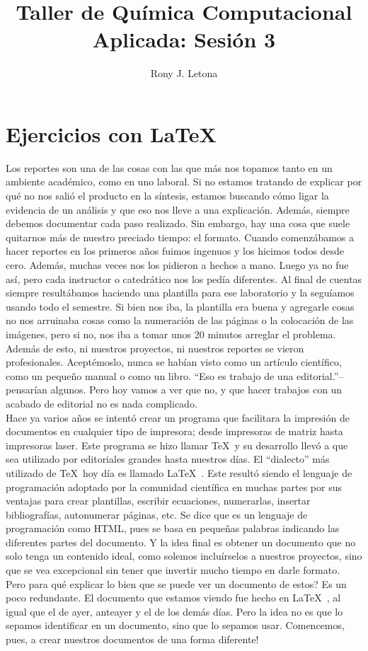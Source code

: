 \documentclass[10pt,letterpaper]{article}
\author{Rony J. Letona}
\title{Taller de Qu\'imica Computacional Aplicada: Sesi\'on 3}
\begin{document}
\maketitle

\section{Ejercicios con \LaTeX\ }
Los reportes son una de las cosas con las que m\'as nos topamos tanto en un ambiente acad\'emico, como en uno laboral. Si no estamos tratando de explicar por qu\'e no nos sali\'o el producto en la s\'intesis, estamos buscando c\'omo ligar la evidencia de un an\'alisis y que eso nos lleve a una explicaci\'on. Adem\'as, siempre debemos documentar cada paso realizado. Sin embargo, hay una cosa que suele quitarnos m\'as de nuestro preciado tiempo: el formato. Cuando comenz\'abamos a hacer reportes en los primeros a\~nos fuimos ingenuos y los hicimos todos desde cero. Adem\'as, muchas veces nos los pidieron a hechos a mano. Luego ya no fue as\'i, pero cada instructor o catedr\'atico nos los ped\'ia diferentes. Al final de cuentas siempre result\'abamos haciendo una plantilla para ese laboratorio y la segu\'iamos usando todo el semestre. Si bien nos iba, la plantilla era buena y agregarle cosas no nos arruinaba cosas como la numeraci\'on de las p\'aginas o la colocaci\'on de las im\'agenes, pero si no, nos iba a tomar unos 20 minutos arreglar el problema. Adem\'as de esto, ni nuestros proyectos, ni nuestros reportes se vieron profesionales. Acept\'emoslo, nunca se hab\'ian visto como un art\'iculo cient\'ifico, como un peque\~no manual o como un libro. ``Eso es trabajo de una editorial.''--pensar\'ian algunos. Pero hoy vamos a ver que no, y que hacer trabajos con un acabado de editorial no es nada complicado.\\

Hace ya varios a\~nos se intent\'o crear un programa que facilitara la impresi\'on de documentos en cualquier tipo de impresora; desde impresoras de matriz hasta impresoras laser. Este programa se hizo llamar \TeX\ y su desarrollo llev\'o a que sea utilizado por editoriales grandes hasta nuestros d\'ias. El ``dialecto'' m\'as utilizado de \TeX\ hoy d\'ia es llamado \LaTeX\ . Este result\'o siendo el lenguaje de programaci\'on adoptado por la comunidad cient\'ifica en muchas partes por sus ventajas para crear plantillas, escribir ecuaciones, numerarlas, insertar bibliograf\'ias, autonumerar p\'aginas, etc. Se dice que es un lenguaje de programaci\'on como HTML, pues se basa en peque\~nas palabras indicando las diferentes partes del documento. Y la idea final es obtener un documento que no solo tenga un contenido ideal, como solemos inclu\'irselos a nuestros proyectos, sino que se vea excepcional sin tener que invertir mucho tiempo en darle formato. Pero para qu\'e explicar lo bien que se puede ver un documento de estos? Es un poco redundante. El documento que estamos viendo fue hecho en \LaTeX\ , al igual que el de ayer, anteayer y el de los dem\'as d\'ias. Pero la idea no es que lo sepamos identificar en un documento, sino que lo sepamos usar. Comencemos, pues, a crear nuestros documentos de una forma diferente!
\end{document}
